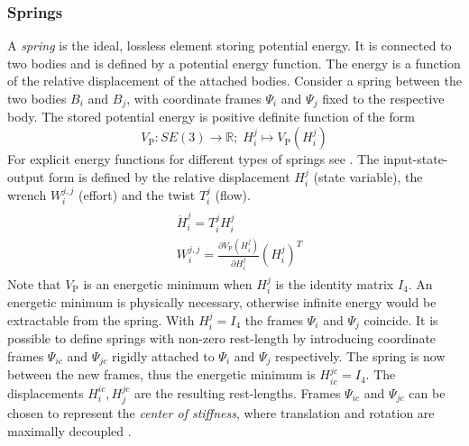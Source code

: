 \documentclass[a4paper,twoside, openright,12pt]{report}
\newcommand{\g}[1]{\text{#1}}
\begin{document}
{\subsubsection{Springs}
A \emph{spring} is the ideal, lossless element storing potential energy. It is connected to two bodies and is defined by a potential energy function. The energy is a function of the relative displacement of the attached bodies. Consider a spring between the two bodies $ B_i $ and $ B_j $,  with coordinate frames $ \Psi_i $ and $ \Psi_j $ fixed to the respective body. The stored potential energy is positive definite function of the form 
\begin{equation}\label{EQ:SpringEnergyFunction}
	V_{\g{P}} : SE(3) \rightarrow \mathbb{R}; \; H_i^j \mapsto V_{\g{P}}(H_i^j)
\end{equation}
For explicit energy functions for different types of springs see \cite{Stramigioli_01}.
The input-state-output form is defined by the relative displacement $H_i^j$ (state variable), the wrench $W_i^{j,j}$ (effort) and the twist $T_i^j$ (flow).
\begin{eqnarray}
\begin{aligned}
	&\dot{H}_i^j = T_i^{j}H_i^j\\
	&W_i^{j,j} = \frac{\partial V_{\g{P}}(H_i^j)}{\partial H_i^j}(H_i^j)^T
\end{aligned}
\end{eqnarray}
Note that $ V_{\g{P}} $ is an energetic minimum when $ H_i^j $ is the identity matrix $I_4$. An energetic minimum is physically necessary, otherwise infinite energy would be extractable from the spring. With $ H_i^j = I_4 $ the frames $ \Psi_i $ and $\Psi_j$ coincide.
It is possible to define springs with non-zero rest-length by introducing coordinate frames $ \Psi_{ic} $ and $\Psi_{jc}$ rigidly attached to $ \Psi_i $ and $\Psi_j$ respectively. The spring is now between the new frames, thus the energetic minimum is $H_{ic}^{jc} = I_4$. The displacements $ H_i^{ic}, H_j^{jc} $ are the resulting rest-lengths. Frames $ \Psi_{ic} $ and $\Psi_{jc}$ can be chosen to represent the \emph{center of stiffness}, where translation and rotation are maximally decoupled \cite{Stramigioli_99}.


}
\end{document}
